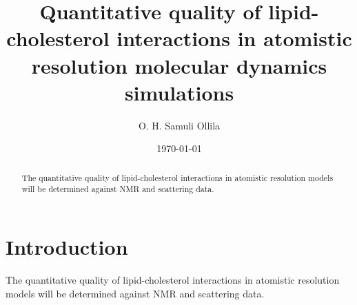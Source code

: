 \documentclass[aps,prl,superscriptaddress,twocolumn]{revtex4}
\begin{document}

\title{Quantitative quality of lipid-cholesterol interactions in atomistic resolution molecular dynamics simulations} %



\author{O. H. Samuli Ollila}



\date{\today}

\begin{abstract}
The quantitative quality of lipid-cholesterol interactions in atomistic resolution models will be determined against 
NMR and scattering data.
\end{abstract}


\maketitle %



\section{Introduction}
The quantitative quality of lipid-cholesterol interactions in atomistic resolution models will be determined against 
NMR and scattering data.
\end{document}
